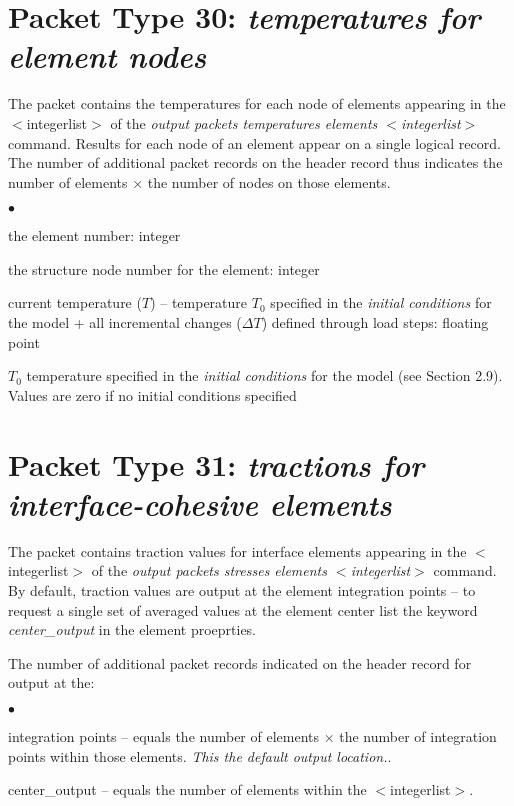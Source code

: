 \documentclass[10pt]{report}
\numberwithin{equation}{section}
\newcommand{\ti}{\emph}
\newcommand{\squishlist}{
 \begin{list}{$\bullet$}
  { \setlength{\itemsep}{0pt}
     \setlength{\parsep}{3pt}
     \setlength{\topsep}{3pt}
     \setlength{\partopsep}{0pt}
     \setlength{\leftmargin}{1.5em}
     \setlength{\labelwidth}{1em}
     \setlength{\labelsep}{0.5em} } }
\newcommand{\squishend}{
  \end{list}  }
\begin{document}
\section{Packet Type 30: \ti{temperatures for element nodes}}
The packet contains the temperatures for each node 
of elements appearing in the $<$integerlist$>$ of the \ti{output 
packets temperatures elements  $<$integerlist$>$ } command. 
Results for each node of an element appear on a single logical record. 
The number of additional packet records on the header record thus 
indicates the number of elements $\times$ the number of nodes on those elements.
\squishlist
\item the element number:  integer
\item the structure node number for the element:  integer
\item current temperature ($T$) --  temperature $T_0$ 
specified in the \ti{initial conditions} for the model +
all incremental changes ($\Delta T$) defined through load steps:  floating point
\item $T_0$ temperature specified in the \ti{initial conditions} for the model (see Section 2.9). 
Values are zero if no
initial conditions specified
\squishend

%
%
\section{Packet Type 31: \ti{tractions for interface-cohesive elements}}
The packet contains traction values for interface elements appearing in 
the $<$integerlist$>$ of the \ti{output packets stresses
 elements $<$integerlist$>$ }command. By default, traction 
 values are output at the element integration points -- to request a single
 set of averaged values at the element center list the keyword \ti{center\_output}
 in the element proeprties.
 
\noindent The number of additional packet records indicated on the header 
record for output at the:
\squishlist
\item integration points -- equals the number of elements $\times$ the number of integration 
 points within those elements. \ti{This the default output location.}.
 \item center\_output --  equals the number of elements within the $<$integerlist$>$.
 \squishend
\end{document}

